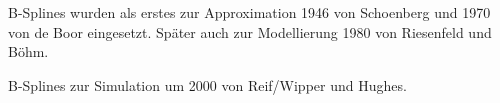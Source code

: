 

B-Splines wurden als erstes zur Approximation 1946 von Schoenberg und 1970 von de Boor eingesetzt.
Später auch zur Modellierung 1980 von Riesenfeld und Böhm.


B-Splines zur Simulation um 2000 von Reif/Wipper und Hughes.
